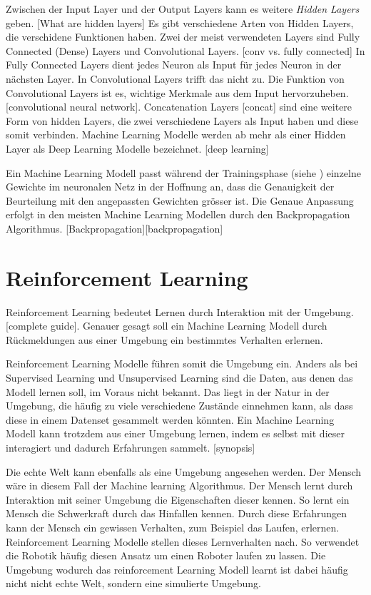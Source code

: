 Zwischen der Input Layer und der Output Layers kann es weitere \emph{Hidden
Layers} geben. [What are hidden layers] Es gibt verschiedene Arten von Hidden
Layers, die verschidene Funktionen haben. Zwei der meist verwendeten Layers sind
Fully Connected (Dense) Layers und Convolutional Layers. [conv vs. fully
connected] In Fully Connected Layers dient jedes Neuron als Input für jedes
Neuron in der nächsten Layer. In Convolutional Layers trifft das nicht zu. Die
Funktion von Convolutional Layers ist es, wichtige Merkmale aus dem Input
hervorzuheben. [convolutional neural network]. Concatenation Layers [concat]
sind eine weitere Form von hidden Layers, die zwei verschiedene Layers als Input
haben und diese somit verbinden. Machine Learning Modelle werden ab mehr als
einer Hidden Layer als Deep Learning Modelle bezeichnet. [deep learning]


Ein Machine Learning Modell passt während der Trainingsphase (siehe
) einzelne Gewichte im neuronalen Netz in der
Hoffnung an, dass die Genauigkeit der Beurteilung mit den angepassten Gewichten
grösser ist. Die Genaue Anpassung erfolgt in den meisten Machine Learning
Modellen durch den Backpropagation Algorithmus. [Backpropagation][backpropagation]



\section{Reinforcement Learning}
\label{chap:t_rl}
Reinforcement Learning bedeutet Lernen durch Interaktion mit der Umgebung.
[complete guide]. Genauer gesagt soll ein Machine Learning Modell durch
Rückmeldungen aus einer Umgebung ein bestimmtes Verhalten erlernen.

Reinforcement Learning Modelle führen somit die Umgebung ein. Anders als bei
Supervised Learning und Unsupervised Learning sind die Daten, aus denen das
Modell lernen soll, im Voraus nicht bekannt. Das liegt in der Natur in der
Umgebung, die häufig zu viele verschiedene Zustände einnehmen kann, als dass
diese in einem Datenset gesammelt werden könnten. Ein Machine Learning Modell
kann trotzdem aus einer Umgebung lernen, indem es selbst mit dieser interagiert
und dadurch Erfahrungen sammelt. [synopsis]

Die echte Welt kann ebenfalls als eine Umgebung angesehen werden. Der Mensch
wäre in diesem Fall der Machine learning Algorithmus. Der Mensch lernt durch
Interaktion mit seiner Umgebung die Eigenschaften dieser kennen. So lernt ein
Mensch die Schwerkraft durch das Hinfallen kennen. Durch diese Erfahrungen kann
der Mensch ein gewissen Verhalten, zum Beispiel das Laufen, erlernen.
Reinforcement Learning Modelle stellen dieses Lernverhalten nach. So verwendet
die Robotik häufig diesen Ansatz um einen Roboter laufen zu lassen. Die Umgebung
wodurch das reinforcement Learning Modell learnt ist dabei häufig nicht nicht
echte Welt, sondern eine simulierte Umgebung.



